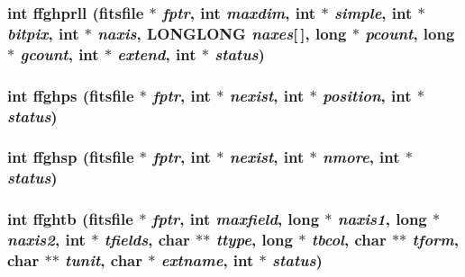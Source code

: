 \subsubsection{\setlength{\rightskip}{0pt plus 5cm}int ffghprll (\bf{fitsfile} $\ast$ {\em fptr}, int {\em maxdim}, int $\ast$ {\em simple}, int $\ast$ {\em bitpix}, int $\ast$ {\em naxis}, \bf{LONGLONG} {\em naxes}[$\,$], long $\ast$ {\em pcount}, long $\ast$ {\em gcount}, int $\ast$ {\em extend}, int $\ast$ {\em status})}\label{src_2fitsio_8h_0d54065b1609c1b7edcbe08454996773}


\subsubsection{\setlength{\rightskip}{0pt plus 5cm}int ffghps (\bf{fitsfile} $\ast$ {\em fptr}, int $\ast$ {\em nexist}, int $\ast$ {\em position}, int $\ast$ {\em status})}\label{src_2fitsio_8h_5bc2324399a2cc4c0cf179c6af73c253}


\subsubsection{\setlength{\rightskip}{0pt plus 5cm}int ffghsp (\bf{fitsfile} $\ast$ {\em fptr}, int $\ast$ {\em nexist}, int $\ast$ {\em nmore}, int $\ast$ {\em status})}\label{src_2fitsio_8h_72d53ce1ae759524a27f68fc55dbc9ab}


\subsubsection{\setlength{\rightskip}{0pt plus 5cm}int ffghtb (\bf{fitsfile} $\ast$ {\em fptr}, int {\em maxfield}, long $\ast$ {\em naxis1}, long $\ast$ {\em naxis2}, int $\ast$ {\em tfields}, char $\ast$$\ast$ {\em ttype}, long $\ast$ {\em tbcol}, char $\ast$$\ast$ {\em tform}, char $\ast$$\ast$ {\em tunit}, char $\ast$ {\em extname}, int $\ast$ {\em status})}\label{src_2fitsio_8h_31a49b3fe1b2a1e589794d420e2082fb}


